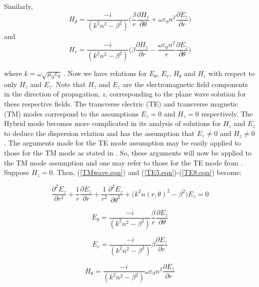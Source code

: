 \documentclass[12pt]{article}
\theoremstyle{definition}
\numberwithin{equation}{section}
\begin{document}
Similarly,
\begin{equation}
H_\theta = \frac{-i}{(k^2 n^2 -\beta^2 )}\bigg(\frac{\beta}{r}\frac{\partial H_z}{\partial\theta}+\omega\varepsilon_0 n^2\frac{\partial E_z}{\partial r}\bigg)
\label{TE7.eqn}
\end{equation}
and
\begin{equation}
H_r = \frac{-i}{(k^2 n^2 -\beta^2 )}\bigg(\beta\frac{\partial H_z}{\partial r} -\frac{\omega\varepsilon_0 n^2}{r}\frac{\partial E_z}{\partial\theta}\bigg)
\label{TE8.eqn}
\end{equation}


where $k=\omega\sqrt{\mu_0\varepsilon_0}\,$. Now we have relations for $E_\theta$, $E_r$, $H_\theta$ and $H_r$ with respect to only $H_z$ and $E_z$.  Note that $H_z$ and $E_z$ are the electromagnetic field components in the direction of propagation, $z$, corresponding to the plane wave solution for these respective fields. The transverse electric (TE) and transverse magnetic (TM) modes correspond to the assumptions $E_z=0$ and $H_z=0$ respectively. The Hybrid mode becomes more complicated in its analysis of solutions for $H_z$ and $E_z$ to deduce the dispersion relation and has the assumption that $E_z\neq 0$ and $H_z\neq 0$. The arguments made for the TE mode assumption may be easily applied to those for the TM mode as stated in \cite{Okamoto}. So, these arguments will now be applied to the TM mode assumption and one may refer to those for the TE mode from \cite{Okamoto}. Suppose $H_z=0$. Then, (\ref{TMwave.eqn}) and (\ref{TE5.eqn})-(\ref{TE8.eqn}) become:

\begin{equation} 
\frac{\partial^{2}E_{z}}{\partial r^2}+\frac{1}{r}\frac{\partial E_z}{\partial r}+\frac{1}{r^{2}}\frac{\partial^{2}E_z}{\partial\theta^2}+\big( k^{2}n(r,\theta)^{2}-\beta^{2}\big) E_z =0
\label{TMwave1.eqn}
\end{equation}

\begin{equation}
E_\theta = \frac{-i}{(k^2 n^2 -\beta^2 )}\frac{\beta}{r}\frac{\partial E_z}{\partial\theta}
\label{TM1.eqn}
\end{equation}

\begin{equation}
E_r = \frac{-i}{(k^2 n^2 -\beta^2 )}\beta\frac{\partial E_z}{\partial r} 
\label{TM2.eqn}
\end{equation}

\begin{equation}
H_\theta = \frac{-i}{(k^2 n^2 -\beta^2 )}\omega\varepsilon_0 n^2\frac{\partial E_z}{\partial r}
\label{TM3.eqn}
\end{equation}
\end{document}
